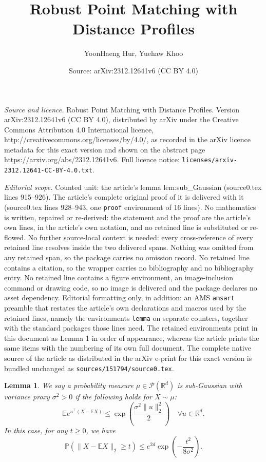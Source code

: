 \documentclass[10pt,a4paper]{amsart}
\title{Robust Point Matching with Distance Profiles}
\author{YoonHaeng Hur, Yuehaw Khoo}
\date{Source: arXiv:2312.12641v6 (CC BY 4.0)}
\newtheorem{lemma}{Lemma}
\newcommand{\E}{\mathbb{E}} %
\renewcommand{\P}{\mathbb{P}}
\newcommand{\R}{\mathbb{R}}
\begin{document}
\maketitle

\noindent\emph{Source and licence.} Robust Point Matching with Distance Profiles. Version arXiv:2312.12641v6 (CC BY 4.0), distributed by arXiv under the Creative Commons Attribution 4.0 International licence, http://creativecommons.org/licenses/by/4.0/, as recorded in the arXiv licence metadata for this exact version and shown on the abstract page https://arxiv.org/abs/2312.12641v6. Full licence notice: \texttt{licenses/arxiv-2312.12641-CC-BY-4.0.txt}.\par\smallskip

\noindent\textit{Editorial scope.} Counted unit: the article's lemma lem:sub\_Gaussian (source0.tex lines 915--926). The article's complete original proof of it is delivered with it (source0.tex lines 928--943, one \texttt{proof} environment of 16 lines). No mathematics is written, repaired or re-derived: the statement and the proof are the article's own lines, in the article's own notation, and no retained line is substituted or re-flowed.  No further source-local context is needed: every cross-reference of every retained line resolves inside the two delivered spans.  Nothing was omitted from any retained span, so the package carries no omission record.  No retained line contains a citation, so the wrapper carries no bibliography and no bibliography entry.  No retained line contains a figure environment, an image-inclusion command or drawing code, so no image is delivered and the package declares no asset dependency.  Editorial formatting only, in addition: an AMS \texttt{amsart} preamble that restates the article's own declarations and macros used by the retained lines, namely the environments \texttt{lemma} on separate counters, together with the standard packages those lines need.  The retained environments print in this document as Lemma 1 in order of appearance, whereas the article prints the same items with the numbering of its own full document.  The complete native source of the article as distributed in the arXiv e-print for this exact version is bundled unchanged as \texttt{sources/151794/source0.tex}.
\begin{lemma}
    \label{lem:sub_Gaussian}
    We say a probability measure $\mu \in \mathscr{P}(\R^d)$ is sub-Gaussian with variance proxy $\sigma^2 > 0$ if the following holds for $X \sim \mu$:
    \begin{equation*}
        \E e^{u^\top (X - \E X)} \le \exp\left(\frac{\sigma^2 \|u\|_2^2}{2}\right) \quad \forall u \in \R^d.
    \end{equation*}
    In this case, for any $t \ge 0$, we have 
    \begin{equation}
        \label{eq:sub_Gaussian_concentration}
        \P\left(\|X - \E X\|_2 \ge t\right) \le e^{2 d} \exp\left(-\frac{t^2}{8 \sigma^2}\right).
    \end{equation}
\end{lemma}
\end{document}
